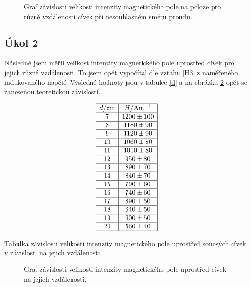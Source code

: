 \documentclass[a4paper,12pt]{article}
\begin{document}
\begin{figure}

\caption{Graf závislosti velikosti intenzity magnetického pole na poloze pro různě vzdálenosti cívek při nesouhlasném směru proudu.}
\label{g2}
\end{figure}

\subsection{Úkol 2}
Následně jsem měřil velikost intenzity magnetického pole uprostřed cívek pro jejich různé vzdálenosti. To jsem opět vypočítal dle vztahu \ref{H3} 
z naměřeného indukovaného napětí. Výsledné hodnoty jsou v tabulce \ref{d} a na obrázku \ref{g3} opět se zanesenou teoretickou závislostí.

\begin{table}
$$
\begin{array}{|c|c|}
\hline
d/\mbox{cm}& H/\mbox{Am}^{-1} \\ \hline
7& 1200\pm100 \\ \hline
8&  1180\pm90 \\ \hline
9&  1120\pm90 \\ \hline
10& 1060\pm80   \\ \hline
11& 1010\pm80 \\ \hline
12& 950\pm80    \\ \hline
13& 890\pm70 \\ \hline
14& 840\pm70    \\ \hline
15& 790\pm60 \\ \hline
16& 740\pm60    \\ \hline
17& 690\pm50 \\ \hline
18& 640\pm50    \\ \hline
19& 600\pm50 \\ \hline
20& 560\pm40    \\ \hline
\end{array}
$$
\caption{Tabulka závislosti velikosti intenzity magnetického pole uprostřed souosých cívek v závislosti na jejich vzdálenosti.}
\label{d}
\end{table}

\begin{figure}

\caption{Graf závislosti velikosti intenzity magnetického pole uprostřed cívek na jejich vzdálenosti.}
\label{g3}
\end{figure}
\end{document}
